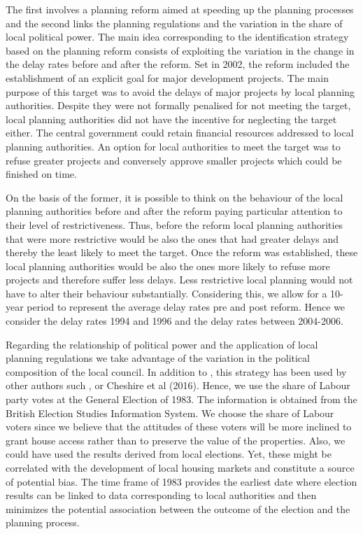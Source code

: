 \documentclass[12pt,letterpaper]{article}
\begin{document}
     The first involves a planning reform aimed at speeding up the planning processes and the
      second links the planning regulations and the variation in the share of local political power. 
The main idea corresponding to the identification strategy based on the planning reform consists
 of exploiting the variation in the change in the delay rates before and after the reform. Set in 2002,
  the reform included the establishment of an explicit goal for major development projects. The main
   purpose of this target was to avoid the delays of major projects by local planning authorities. Despite
    they were not formally penalised for not meeting the target, local planning authorities did not have
     the incentive for neglecting the target either. The central government could retain financial resources
      addressed to local planning authorities. An option for local authorities to meet the target was to refuse 
      greater projects and conversely approve smaller projects which could be finished on time. 
      
On the basis of the former, it is possible to think on the behaviour of the local planning authorities
 before and after the reform paying particular attention to their level of restrictiveness. Thus, before 
 the reform local planning authorities that were more restrictive would be also the ones that had greater 
 delays and thereby the least likely to meet the target. Once the reform was established, these local 
 planning authorities would be also the ones more likely to refuse more projects and therefore suffer less
  delays. Less restrictive local planning would not have to alter their behaviour substantially.
   Considering this, we allow for a 10-year period to represent the average delay rates pre and post reform.
    Hence we consider the delay rates 1994 and 1996 and the delay rates between 2004-2006.  
    
Regarding the relationship of political power and the application of local planning regulations we take
 advantage of the variation in the political composition of the local council. In addition to 
 \citet{hilber2016supply},
  this strategy has been used by other authors such \cite{bertrand2002does}, \cite{sadun2015} or Cheshire et al (2016).
  Hence, we use the share of Labour party votes at the General Election of 1983.
   The information is obtained from the British Election Studies Information System.  
   We choose the share of Labour voters since we believe that the attitudes of these voters 
   will be more inclined to grant house access rather than to preserve the value of the properties.
    Also, we could have used the results derived from local elections. 
    Yet, these might be correlated with the development of local housing markets and constitute a source
     of potential bias. The time frame of 1983 provides the earliest date where election results can be linked
      to data corresponding to local authorities and then minimizes the potential association between the
       outcome of the election and the planning process.
         
\end{document}
